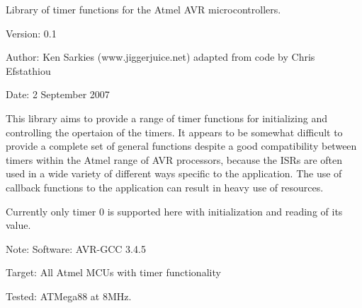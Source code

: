 Library of timer functions for the Atmel AVR microcontrollers.\begin{Desc}
\item[Version:]0.1 \end{Desc}
\begin{Desc}
\item[Author:]Ken Sarkies (www.jiggerjuice.net) adapted from code by Chris Efstathiou \end{Desc}
\begin{Desc}
\item[Date:]2 September 2007\end{Desc}
This library aims to provide a range of timer functions for initializing and controlling the opertaion of the timers. It appears to be somewhat difficult to provide a complete set of general functions despite a good compatibility between timers within the Atmel range of AVR processors, because the ISRs are often used in a wide variety of different ways specific to the application. The use of callback functions to the application can result in heavy use of resources.

Currently only timer 0 is supported here with initialization and reading of its value.

\begin{Desc}
\item[Note:]Software: AVR-GCC 3.4.5 

Target: All Atmel MCUs with timer functionality 

Tested: ATMega88 at 8MHz. \end{Desc}
